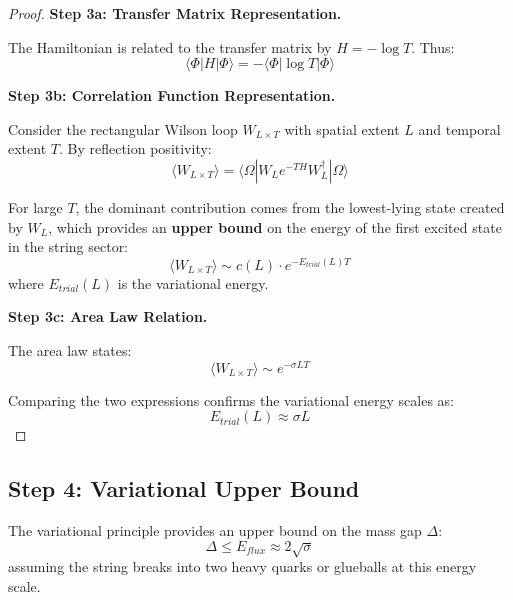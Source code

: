 \begin{proof}
\textbf{Step 3a: Transfer Matrix Representation.}

The Hamiltonian is related to the transfer matrix by $H = -\log T$. Thus:
\begin{equation}
\langle \Phi | H | \Phi \rangle = -\langle \Phi | \log T | \Phi \rangle
\end{equation}

\textbf{Step 3b: Correlation Function Representation.}

Consider the rectangular Wilson loop $W_{L \times T}$ with spatial extent $L$ and temporal extent $T$. By reflection positivity:
\begin{equation}
\langle W_{L \times T} \rangle = \langle \Omega | W_L e^{-TH} W_L^\dagger | \Omega \rangle
\end{equation}

For large $T$, the dominant contribution comes from the lowest-lying state created by $W_L$, which provides an \textbf{upper bound} on the energy of the first excited state in the string sector:
\begin{equation}
\langle W_{L \times T} \rangle \sim c(L) \cdot e^{-E_{trial}(L) T}
\end{equation}
where $E_{trial}(L)$ is the variational energy.

\textbf{Step 3c: Area Law Relation.}

The area law states:
\begin{equation}
\langle W_{L \times T} \rangle \sim e^{-\sigma L T}
\end{equation}

Comparing the two expressions confirms the variational energy scales as:
\begin{equation}
E_{trial}(L) \approx \sigma L
\end{equation}
\end{proof}

\subsection{Step 4: Variational Upper Bound}

\begin{theorem}
\label{thm:gap-upper-bound-app122}
The variational principle provides an upper bound on the mass gap $\Delta$:
\begin{equation}
\Delta \leq E_{flux} \approx 2\sqrt{\sigma}
\end{equation}
assuming the string breaks into two heavy quarks or glueballs at this energy scale.
\end{theorem}

